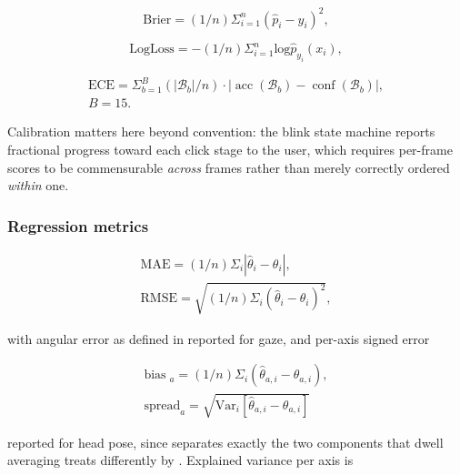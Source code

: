 \begin{equation}
\label{eq:148}
\mathrm{Brier} = (1/n) \Sigma _{i=1}^{n} ( \hat{p}_i - y_i )^{2} ,
\end{equation}

\begin{equation}
\label{eq:149}
\mathrm{LogLoss} = - (1/n) \Sigma _{i=1}^{n} \mathrm{log} \hat{p}_{y_i}(x_i) ,
\end{equation}

\begin{equation}
\label{eq:150}
\begin{aligned}
\mathrm{ECE} = \Sigma _{b=1}^{B} ( |\mathcal{B}_b| / n ) \cdot | \;\text{acc}\;(\mathcal{B}_b) - \;\text{conf}\;(\mathcal{B}_b) | , \\
B = 15.
\end{aligned}
\end{equation}

Calibration matters here beyond convention: the blink state machine reports fractional progress toward each click stage to the user, which requires per-frame scores to be commensurable \emph{across} frames rather than merely correctly ordered \emph{within} one.

\subsubsection{Regression metrics}

\begin{equation}
\label{eq:151}
\begin{aligned}
\mathrm{MAE} = (1/n) \Sigma _i | \hat{\theta }_i - \theta _i | , \\
\mathrm{RMSE} = \sqrt{(1/n) \Sigma _i ( \hat{\theta }_i - \theta _i )^{2}} ,
\end{aligned}
\end{equation}

with angular error as defined in  reported for gaze, and per-axis signed error

\begin{equation}
\label{eq:152}
\begin{aligned}
\text{bias}\;_a = (1/n) \Sigma _i ( \hat{\theta }_{a,i} - \theta _{a,i} ) , \\
\mathrm{spread}_a = \sqrt{\mathrm{Var}_i[ \hat{\theta }_{a,i} - \theta _{a,i} ]}
\end{aligned}
\end{equation}

reported for head pose, since  separates exactly the two components that dwell averaging treats differently by . Explained variance per axis is

